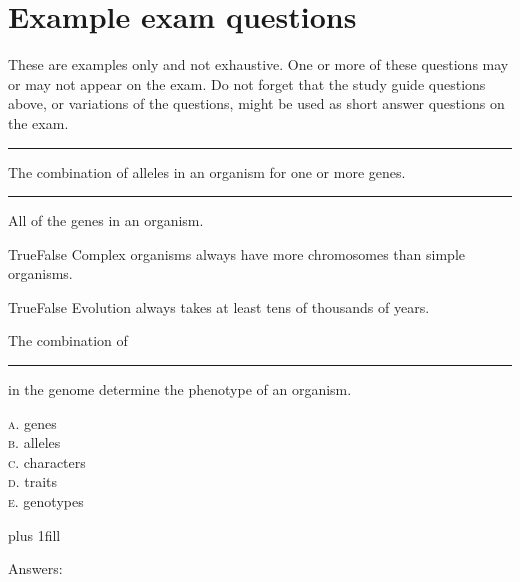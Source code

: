 \documentclass[letterpaper]{tufte-handout}
\begin{document}
\section*{Example exam questions}

These are examples only and not exhaustive. One or more of these questions may or may not appear on the exam. Do not forget that the study guide questions above, or variations of the questions, might be used as short answer questions on the exam. 

\begin{fullwidth}

\bigskip

\noindent \rule{1in}{0.4pt} The combination of alleles in an organism for one or more genes.

\bigskip

\noindent \rule{1in}{0.4pt} All of the genes in an organism.

\bigskip

\noindent True\hspace{1em}False\hspace{1em} Complex organisms always have more chromosomes than simple organisms. 

\bigskip

\noindent True\hspace{1em}False\hspace{1em} Evolution always takes at least tens of thousands of years.

\bigskip

\noindent The combination of \rule{1in}{0.4pt} in the genome determine the phenotype of an organism.

\smallskip

\noindent \textsc{a}. genes\\
\noindent \textsc{b}. alleles\\
\noindent \textsc{c}. characters\\
\noindent \textsc{d}. traits\\
\noindent \textsc{e}. genotypes\\

\end{fullwidth}

\vskip0pt plus 1fill

\hfill Answers: 
\end{document}
